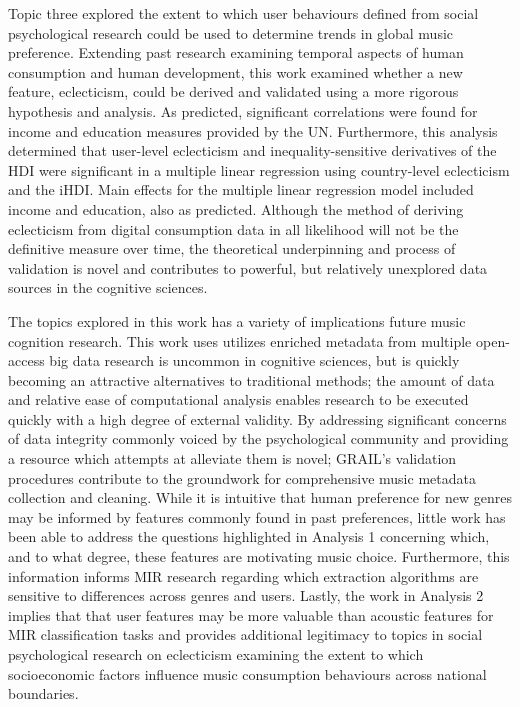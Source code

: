 \documentclass[a4paper]{article}
\begin{document}
Topic three explored the extent to which user behaviours defined from social psychological research could be used to determine trends in global music preference. Extending past research examining temporal aspects of human consumption \cite{woolhouse2013work} and human development, this work examined whether a new feature, eclecticism, could be derived and validated using a more rigorous hypothesis and analysis. As predicted, significant correlations were found for income and education measures provided by the \Gls{UN}. Furthermore, this analysis determined that user-level eclecticism and inequality-sensitive derivatives of the \Gls{HDI} were significant in a multiple linear regression using country-level eclecticism and the \Gls{iHDI}. Main effects for the multiple linear regression model included income and education, also as predicted. Although the method of deriving eclecticism from digital consumption data in all likelihood will not be the definitive measure over time, the theoretical underpinning and process of validation is novel and contributes to powerful, but relatively unexplored data sources in the cognitive sciences. 

The topics explored in this work has a variety of implications future music cognition research. This work uses utilizes enriched metadata from multiple open-access big data research is uncommon in cognitive sciences, but is quickly becoming an attractive alternatives to traditional methods; the amount of data and relative ease of computational analysis enables research to be executed quickly with a high degree of external validity. By addressing significant concerns of data integrity commonly voiced by the psychological community and providing a resource which attempts at alleviate them is novel; \Gls{GRAIL}'s validation procedures contribute to the groundwork for comprehensive music metadata collection and cleaning. While it is intuitive that human preference for new genres may be informed by features commonly found in past preferences, little work has been able to address the questions highlighted in Analysis 1 concerning which, and to what degree, these features are motivating music choice. Furthermore, this information informs MIR research regarding which extraction algorithms are sensitive to differences across genres and users. Lastly, the work in Analysis 2 implies that that user features may be more valuable than acoustic features for MIR classification tasks  and provides additional legitimacy to topics in social psychological research on eclecticism examining the extent to which socioeconomic factors influence music consumption behaviours across national boundaries.
\end{document}
